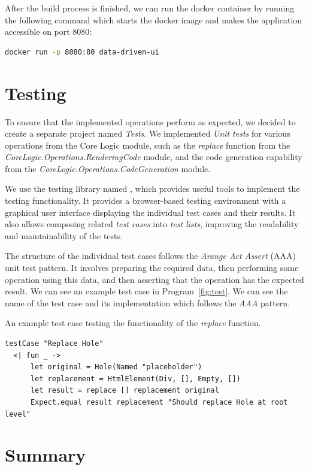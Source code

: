 After the build process is finished, we can run the docker container by running the following command which starts the docker image and makes the application accessible on port 8080:
\begin{lstlisting}[language=bash]
   docker run -p 8080:80 data-driven-ui  
\end{lstlisting}

\medskip
\section{Testing}
\label{sec:testing}
To ensure that the implemented operations perform as expected, we decided to create a separate project named \emph{Tests}.
We implemented \emph{Unit tests} for various operations from the Core Logic module, such as the \emph{replace} function from the \emph{CoreLogic.Operations.RenderingCode} module, and the code generation capability from the \emph{CoreLogic.Operations.CodeGeneration} module.

We use the testing library named \citet{mocha}, which provides useful tools to implement the testing functionality.
It provides a browser-based testing environment with a graphical user interface displaying the individual test cases and their results.
It also allows composing related \emph{test cases} into \emph{test lists}, improving the readability and maintainability of the tests.

The structure of the individual test cases follows the \emph{Arange Act Assert} (AAA) unit test pattern.
It involves preparing the required data, then performing some operation using this data, and then asserting that the operation has the expected result.
We can see an example test case in Program~\ref{fig:test}.
We can see the name of the test case and its implementation which follows the \emph{AAA} pattern.

\begin{listing}[htbp]
	\caption{An example test case testing the functionality of the \emph{replace} function.}
	\label{fig:test}
	\begin{lstlisting}
testCase "Replace Hole"
  <| fun _ ->
      let original = Hole(Named "placeholder")
      let replacement = HtmlElement(Div, [], Empty, [])
      let result = replace [] replacement original
      Expect.equal result replacement "Should replace Hole at root level"
  \end{lstlisting}
\end{listing}

\clearpage
\section{Summary}


